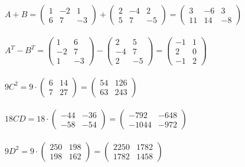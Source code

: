 \documentclass[a4paper, 12pt]{article}
\begin{document}
    \\
    \\ $A + B = \begin{pmatrix} 1 & -2 & 1 \\ 6 & 7 & -3 \end{pmatrix} + \begin{pmatrix} 2 & -4 & 2 \\ 5 & 7 & -5 \end{pmatrix} = \begin{pmatrix}3 & -6 & 3\\11 & 14 & -8\end{pmatrix}$
    \\
    \\ $A^T - B^T = \begin{pmatrix} 1 & 6 \\ -2 & 7 \\ 1 & -3 \end{pmatrix} - \begin{pmatrix} 2 & 5 \\ -4 & 7 \\ 2 & -5 \end{pmatrix} = \begin{pmatrix}-1 & 1\\2 & 0\\-1 & 2\end{pmatrix}$
    \\
    \\ $9C^2 = 9 \cdot \begin{pmatrix}6 & 14\\7 & 27\end{pmatrix} = \begin{pmatrix}54 & 126\\63 & 243\end{pmatrix}$
    \\
    \\ $18CD = 18 \cdot \begin{pmatrix}-44 & -36\\-58 & -54\end{pmatrix} = \begin{pmatrix}-792 & -648\\-1044 & -972\end{pmatrix}$
    \\
    \\ $9D^2 = 9 \cdot \begin{pmatrix}250 & 198\\198 & 162\end{pmatrix} = \begin{pmatrix}2250 & 1782\\1782 & 1458\end{pmatrix}$
\end{document}
